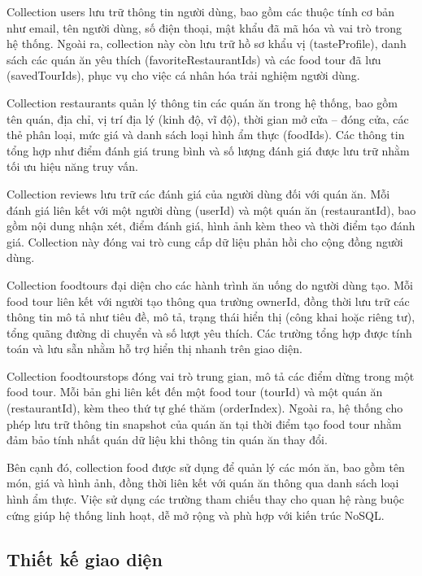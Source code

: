 Collection users lưu trữ thông tin người dùng, bao gồm các thuộc tính cơ bản như email, tên người dùng, số điện thoại, mật khẩu đã mã hóa và vai trò trong hệ thống. Ngoài ra, collection này còn lưu trữ hồ sơ khẩu vị (tasteProfile), danh sách các quán ăn yêu thích (favoriteRestaurantIds) và các food tour đã lưu (savedTourIds), phục vụ cho việc cá nhân hóa trải nghiệm người dùng.

Collection restaurants quản lý thông tin các quán ăn trong hệ thống, bao gồm tên quán, địa chỉ, vị trí địa lý (kinh độ, vĩ độ), thời gian mở cửa – đóng cửa, các thẻ phân loại, mức giá và danh sách loại hình ẩm thực (foodIds). Các thông tin tổng hợp như điểm đánh giá trung bình và số lượng đánh giá được lưu trữ nhằm tối ưu hiệu năng truy vấn.

Collection reviews lưu trữ các đánh giá của người dùng đối với quán ăn. Mỗi đánh giá liên kết với một người dùng (userId) và một quán ăn (restaurantId), bao gồm nội dung nhận xét, điểm đánh giá, hình ảnh kèm theo và thời điểm tạo đánh giá. Collection này đóng vai trò cung cấp dữ liệu phản hồi cho cộng đồng người dùng.

Collection foodtours đại diện cho các hành trình ăn uống do người dùng tạo. Mỗi food tour liên kết với người tạo thông qua trường ownerId, đồng thời lưu trữ các thông tin mô tả như tiêu đề, mô tả, trạng thái hiển thị (công khai hoặc riêng tư), tổng quãng đường di chuyển và số lượt yêu thích. Các trường tổng hợp được tính toán và lưu sẵn nhằm hỗ trợ hiển thị nhanh trên giao diện.

Collection foodtourstops đóng vai trò trung gian, mô tả các điểm dừng trong một food tour. Mỗi bản ghi liên kết đến một food tour (tourId) và một quán ăn (restaurantId), kèm theo thứ tự ghé thăm (orderIndex). Ngoài ra, hệ thống cho phép lưu trữ thông tin snapshot của quán ăn tại thời điểm tạo food tour nhằm đảm bảo tính nhất quán dữ liệu khi thông tin quán ăn thay đổi.

Bên cạnh đó, collection food được sử dụng để quản lý các món ăn, bao gồm tên món, giá và hình ảnh, đồng thời liên kết với quán ăn thông qua danh sách loại hình ẩm thực. Việc sử dụng các trường tham chiếu thay cho quan hệ ràng buộc cứng giúp hệ thống linh hoạt, dễ mở rộng và phù hợp với kiến trúc NoSQL.

\subsection{Thiết kế giao diện}
